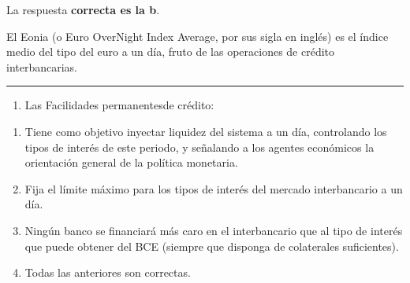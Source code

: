 \documentclass[
  letterpaper,
  DIV=11,
  numbers=noendperiod]{scrreprt}
\providecommand{\tightlist}{%
  \setlength{\itemsep}{0pt}\setlength{\parskip}{0pt}}\usepackage{longtable,booktabs,array}
\begin{document}
\begin{tcolorbox}[enhanced jigsaw, left=2mm, opacityback=0, colback=white, breakable, arc=.35mm, bottomrule=.15mm, rightrule=.15mm, toprule=.15mm, leftrule=.75mm, colframe=quarto-callout-tip-color-frame]
\begin{minipage}[t]{5.5mm}
\textcolor{quarto-callout-tip-color}{\faLightbulb}
\end{minipage}%
\begin{minipage}[t]{\textwidth - 5.5mm}

La respuesta \textbf{correcta es la b}.

El Eonia (o Euro OverNight Index Average, por sus sigla en inglés) es el
índice medio del tipo del euro a un día, fruto de las operaciones de
crédito interbancarias.

\end{minipage}%
\end{tcolorbox}

\begin{center}\rule{0.5\linewidth}{0.5pt}\end{center}

\begin{enumerate}
\def\labelenumi{\arabic{enumi}.}
\setcounter{enumi}{3}
\tightlist
\item
  Las Facilidades permanentesde crédito:
\end{enumerate}

\begin{enumerate}
\def\labelenumi{\alph{enumi})}
\item
  Tiene como objetivo inyectar liquidez del sistema a un día,
  controlando los tipos de interés de este periodo, y señalando a los
  agentes económicos la orientación general de la política monetaria.
\item
  Fija el límite máximo para los tipos de interés del mercado
  interbancario a un día.
\item
  Ningún banco se financiará más caro en el interbancario que al tipo de
  interés que puede obtener del BCE (siempre que disponga de colaterales
  suficientes).
\item
  Todas las anteriores son correctas.
\end{enumerate}
\end{document}
